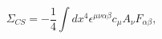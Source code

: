 \begin{equation}
\Sigma _{CS}=-\frac{1}{4}\int dx^{4}\epsilon ^{\mu \nu \alpha \beta }c_{\mu
}A_{\nu }F_{\alpha \beta },  \label{jac}
\end{equation}

